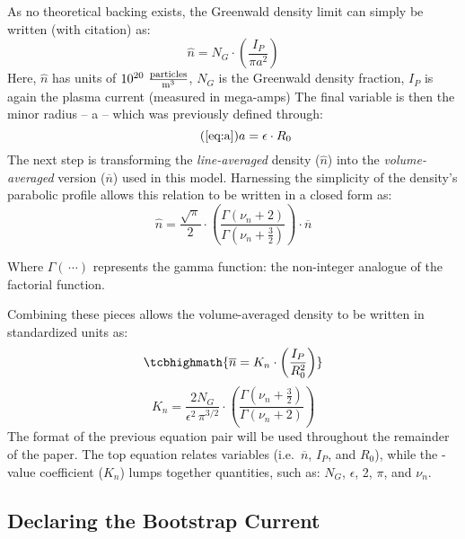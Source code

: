 As no theoretical backing exists, the Greenwald density limit can simply be written (with citation) as: \cite{greenwald}
\begin{equation}
	\hat n = N_G \cdot \left( \frac{ I_P }{ \pi a^2} \right)
\end{equation}
Here, $\hat n$ has units of $10^{20} \ \frac{\textnormal{particles}}{\textnormal{m}^3}$, $N_G$ is the Greenwald density fraction,  $I_P$ is again the plasma current (measured in mega-amps)  The final variable is then the minor radius -- a -- which was previously defined through:
\begin{equation}
	\tag{\ref{eq:a}}
	a = \epsilon \cdot R_0
\end{equation}
The next step is transforming the \emph{line-averaged} density ($\hat n$) into the \emph{volume-averaged} version ($\overline n$) used in this model. Harnessing the simplicity of the density's parabolic profile allows this relation to be written in a closed form as:
 \begin{equation}
 	\hat n = \frac{\sqrt{\pi}}{2} \cdot \left( \frac{\Gamma \left( \nu_n + 2 \right)}{\Gamma \left( \nu_n + \frac{3}{2} \right)} \right) \cdot \overline n 
 \end{equation}
 
 Where $\Gamma( \, \cdots)$ represents the gamma function: the non-integer analogue of the factorial function.
 
 Combining these pieces allows the volume-averaged density to be written in standardized units  as:
 \begin{equation}
 	\label{eq:greenwald}
 	\tcbhighmath{
 	\overline n = K_n \cdot \left( \frac{I_P}{R_0^2} \right)
 	}
 \end{equation}
 \begin{equation}
 	K_n = \frac{2 N_G}{\epsilon^2 \, \pi^{3/2} } \cdot \left( \frac{\Gamma \left( \nu_n + \frac{3}{2} \right)}{\Gamma \left( \nu_n + 2 \right)} \right)
\end{equation}
The format of the previous equation pair will be used throughout the remainder of the paper. The top equation relates  variables (i.e.\ $\overline n$, $I_P$, and $R_0$), while the -value coefficient ($K_n$) lumps together  quantities, such as: $N_G$, $\epsilon$, 2, $\pi$, and $\nu_n$.

\subsection{Declaring the Bootstrap Current}

